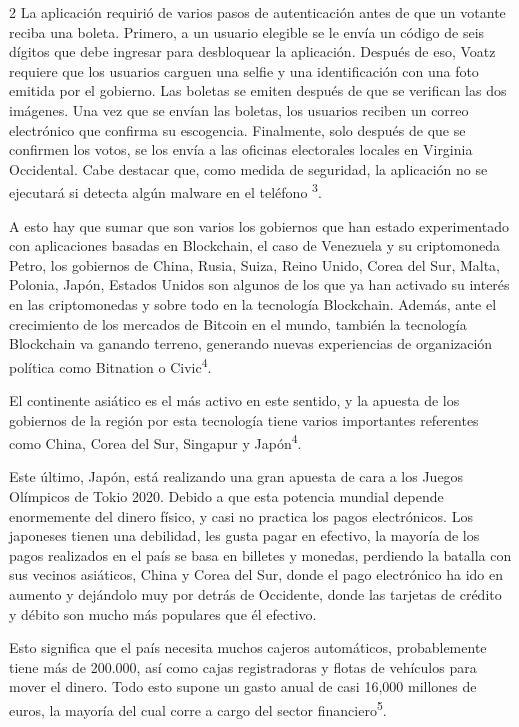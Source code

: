 \documentclass[12pt,spanish,Letterpaper,openany]{book}
\begin{document}
\begin {multicols}{2}
La aplicación requirió de varios pasos de autenticación antes de que un votante reciba una boleta. Primero, a un usuario elegible se le envía un código de seis dígitos que debe ingresar para desbloquear la aplicación. Después de eso, Voatz requiere que los usuarios carguen una selfie y una identificación con una foto emitida por el gobierno. Las boletas se emiten después de que se verifican las dos imágenes. Una vez que se envían las boletas, los usuarios reciben un correo electrónico que confirma su escogencia. Finalmente, solo después de que se confirmen los votos, se los envía a las oficinas electorales locales en Virginia Occidental. Cabe destacar que, como medida de seguridad, la aplicación no se ejecutará si detecta algún malware en el teléfono \textsuperscript{3}.

A esto hay que sumar que son varios los gobiernos que han estado experimentado con aplicaciones basadas en Blockchain, el caso de Venezuela y su criptomoneda Petro, los gobiernos de China, Rusia, Suiza, Reino Unido, Corea del Sur, Malta, Polonia, Japón, Estados Unidos son algunos de los que ya han activado su interés en las criptomonedas y sobre todo en la tecnología Blockchain. Además, ante el crecimiento de los mercados de Bitcoin en el mundo, también la tecnología Blockchain va ganando terreno, generando nuevas experiencias de organización política como Bitnation o Civic\textsuperscript{4}.

El continente asiático es el más activo en este sentido, y la apuesta de los gobiernos de la región por esta tecnología tiene varios importantes referentes como China, Corea del Sur, Singapur y Japón\textsuperscript{4}.

Este último, Japón, está realizando una gran apuesta de cara a los Juegos Olímpicos de Tokio 2020. Debido a que esta potencia mundial depende enormemente del dinero físico, y casi no practica los pagos electrónicos. Los japoneses tienen una debilidad, les gusta pagar en efectivo, la mayoría de los pagos realizados en el país se basa en billetes y monedas, perdiendo la batalla con sus vecinos asiáticos, China y Corea del Sur, donde el pago electrónico ha ido en aumento y dejándolo muy por detrás de Occidente, donde las tarjetas de crédito y débito son mucho más populares que él efectivo.

Esto significa que el país necesita muchos cajeros automáticos, probablemente tiene más de 200.000, así como cajas registradoras y flotas de vehículos para mover el dinero. Todo esto supone un gasto anual de casi 16,000 millones de euros, la mayoría del cual corre a cargo del sector financiero\textsuperscript{5}.


\end{multicols}
\end{document}

